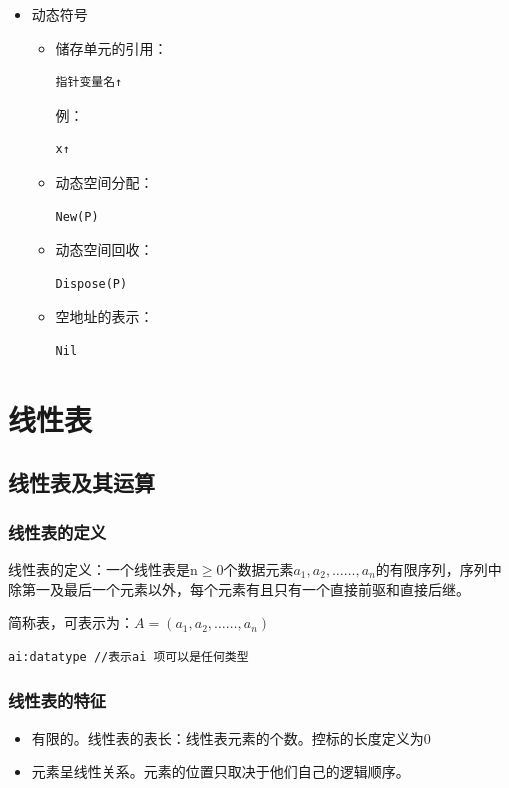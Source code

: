 \documentclass[AutoFakeBold]{LZUThesis2007}
\begin{document}
\begin{enumerate}
\begin{itemize}
	\item 动态符号
\begin{itemize}
	\item 储存单元的引用：
\begin{lstlisting}
指针变量名↑
\end{lstlisting}
例：
\begin{lstlisting}
x↑
\end{lstlisting}
	\item 动态空间分配：
\begin{lstlisting}
New(P)
\end{lstlisting}
	\item 动态空间回收：
\begin{lstlisting}
Dispose(P)
\end{lstlisting}
	\item 空地址的表示：
\begin{lstlisting}
Nil
\end{lstlisting}
\end{itemize}
\end{itemize}
			\end{enumerate}

\chapter{线性表}
	\section{线性表及其运算}
		\subsection{线性表的定义}
		线性表的定义：一个线性表是n$\ge$0个数据元素$a_{1}, a_{2}, \dots \dots, a_{n}$的有限序列，序列中除第一及最后一个元素以外，每个元素有且只有一个直接前驱和直接后继。

		简称表，可表示为：$A=\left(a_{1}, a_{2}, \dots \dots, a_{n}\right)$
\begin{lstlisting}
ai:datatype	//表示ai 项可以是任何类型
\end{lstlisting}

		\subsection{线性表的特征}
			\begin{itemize}
				\item 有限的。线性表的表长：线性表元素的个数。控标的长度定义为0
				\item 元素呈线性关系。元素的位置只取决于他们自己的逻辑顺序。
			\end{itemize}
\end{document}
